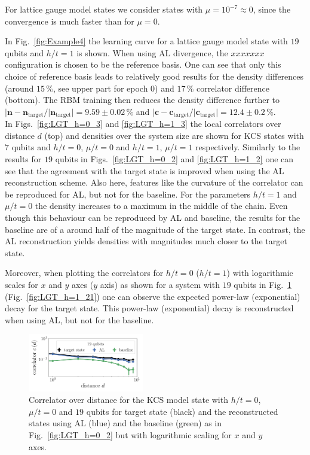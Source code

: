 \documentclass[pra,aps,showpacs,groupedaddress,superscriptaddress,twocolumn,toc=flat,biblatex,footinbib]{revtex4-1}
\renewcommand{\vec}[1]{\bm{#1}}
\begin{document}
For lattice gauge model states we consider states with $\mu=10^{-7}\approx 0$, since the convergence is much faster than for $\mu=0$. 

In Fig.~\ref{fig:Example4} the learning curve for a lattice gauge model state with $19$ qubits and $h/t=1$ is shown. When using AL divergence, the $xxxxxxx$ configuration is chosen to be the reference basis. One can see that only this choice of reference basis leads to relatively good results for the density differences (around $15\,\%$, see upper part for epoch $0$) and $17\,\%$ correlator difference (bottom). The RBM training then reduces the density difference further to $\vert \vec{n}-\vec{n}_{\mathrm{target}}/\vert \vec{n}_{\mathrm{target}}\vert= 9.59\pm 0.02\,\%$ and $\vert \vec{c}-\vec{c}_{\mathrm{target}}/\vert \vec{c}_{\mathrm{target}}\vert= 12.4\pm 0.2\,\%$. \\

In Figs.~\ref{fig:LGT_h=0_3} and \ref{fig:LGT_h=1_3} the local correlators over distance $d$ (top) and densities over the system size are shown for KCS states with $7$ qubits and $h/t=0$, $\mu/t=0$ and $h/t=1$, $\mu/t=1$ respectively. Similarly to the results for $19$ qubits in Figs.~\ref{fig:LGT_h=0_2} and \ref{fig:LGT_h=1_2} one can see that the agreement with the target state is improved when using the AL reconstruction scheme. Also here, features like the curvature of the correlator can be reproduced for AL, but not for the baseline. For the parameters $h/t=1$ and $\mu/t=0$ the density increases to a maximum in the middle of the chain. Even though this behaviour can be reproduced by AL and baseline, the results for the baseline are of a around half of the magnitude of the target state. In contrast, the AL reconstruction yields densities with magnitudes much closer to the target state.

Moreover, when plotting the correlators for $h/t=0$ ($h/t=1$) with logarithmic scales for $x$ and $y$ axes ($y$ axis) as shown for a system with $19$ qubits in Fig.~\ref{fig:LGT_h=0_21} (Fig.~\ref{fig:LGT_h=1_21}) one can observe the expected power-law (exponential) decay for the target state. This power-law (exponential) decay is reconstructed when using AL, but not for the baseline.




\begin{figure}[t]
	\centering
   \includegraphics[width=0.45\textwidth]{Fig17.pdf}
	\caption[]{Correlator over distance for the KCS model state with $h/t=0$, $\mu/t=0$ and $19$ qubits for target state (black) and the reconstructed states using AL (blue) and the baseline (green) as in Fig.~\ref{fig:LGT_h=0_2} but with logarithmic scaling for $x$ and $y$ axes.}
	\label{fig:LGT_h=0_21}
\end{figure}
\end{document}
